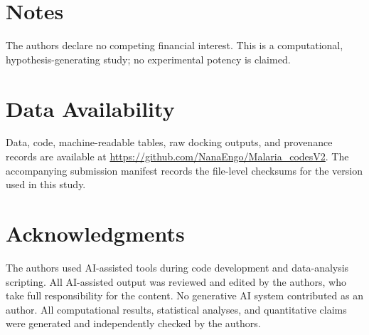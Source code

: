 \documentclass[journal=jcisd8,manuscript=article]{achemso}
\begin{document}
\section*{Notes}
The authors declare no competing financial interest. This is a computational, hypothesis-generating study; no experimental potency is claimed.

\section*{Data Availability}
Data, code, machine-readable tables, raw docking outputs, and provenance records are available at \url{https://github.com/NanaEngo/Malaria_codesV2}. The accompanying submission manifest records the file-level checksums for the version used in this study.

\section*{Acknowledgments}
The authors used AI-assisted tools during code development and data-analysis scripting. All AI-assisted output was reviewed and edited by the authors, who take full responsibility for the content. No generative AI system contributed as an author. All computational results, statistical analyses, and quantitative claims were generated and independently checked by the authors.


\end{document}
